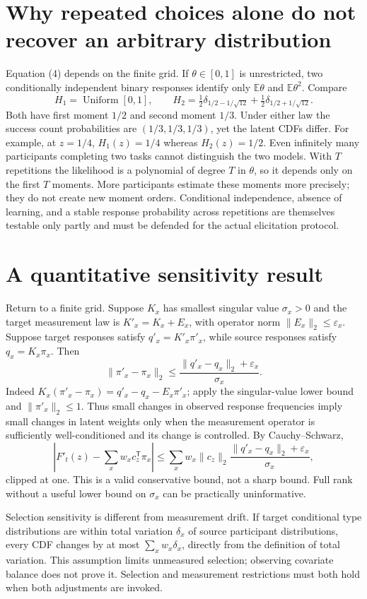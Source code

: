 \documentclass[11pt]{article}
\newcommand{\E}{\mathbb{E}}
\begin{document}
\section{Why repeated choices alone do not recover an arbitrary distribution}
Equation (4) depends on the finite grid. If $\theta\in[0,1]$ is unrestricted,
two conditionally independent binary responses identify only
$\E\theta$ and $\E\theta^2$. Compare
\[
 H_1=\operatorname{Uniform}[0,1],\qquad
 H_2=\tfrac12\delta_{1/2-1/\sqrt{12}}
       +\tfrac12\delta_{1/2+1/\sqrt{12}}.
\]
Both have first moment $1/2$ and second moment $1/3$. Under either law the
success count probabilities are $(1/3,1/3,1/3)$, yet the latent CDFs differ.
For example, at $z=1/4$, $H_1(z)=1/4$ whereas $H_2(z)=1/2$.
Even infinitely many participants completing two tasks cannot distinguish
the two models. With $T$ repetitions the likelihood is a polynomial of
degree $T$ in $\theta$, so it depends only on the first $T$ moments.
More participants estimate these moments more precisely; they do not create
new moment orders. Conditional independence, absence of learning, and a
stable response probability across repetitions are themselves testable only
partly and must be defended for the actual elicitation protocol.

\section{A quantitative sensitivity result}
Return to a finite grid. Suppose $K_x$ has smallest singular value
$\sigma_x>0$ and the target measurement law is
$K'_x=K_x+E_x$, with operator norm $\|E_x\|_2\le\varepsilon_x$.
Suppose target responses satisfy $q'_x=K'_x\pi'_x$, while source responses
satisfy $q_x=K_x\pi_x$. Then
\[
 \|\pi'_x-\pi_x\|_2
 \le\frac{\|q'_x-q_x\|_2+\varepsilon_x}{\sigma_x}.        \tag{5}
\]
Indeed $K_x(\pi'_x-\pi_x)=q'_x-q_x-E_x\pi'_x$;
apply the singular-value lower bound and $\|\pi'_x\|_2\le1$.
Thus small changes in observed response frequencies imply small changes
in latent weights only when the measurement operator is sufficiently
well-conditioned and its change is controlled. By Cauchy--Schwarz,
\[
 |F'_t(z)-\sum_xw_xc_z^\mathsf{T}\pi_x|
 \le\sum_xw_x\|c_z\|_2
 \frac{\|q'_x-q_x\|_2+\varepsilon_x}{\sigma_x},           \tag{6}
\]
clipped at one. This is a valid conservative bound, not a sharp bound.
Full rank without a useful lower bound on $\sigma_x$ can be practically
uninformative.

Selection sensitivity is different from measurement drift. If target
conditional type distributions are within total variation $\delta_x$ of
source participant distributions, every CDF changes by at most
$\sum_xw_x\delta_x$, directly from the definition of total variation.
This assumption limits unmeasured selection; observing covariate balance
does not prove it. Selection and measurement restrictions must both hold
when both adjustments are invoked.
\end{document}
